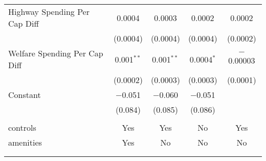 \begin{table}[!htbp]
\begin{tabular}{@{\extracolsep{5pt}}lcccc}
  Highway Spending Per Cap Diff & 0.0004 & 0.0003 & 0.0002 & 0.0002 \\ 
  & (0.0004) & (0.0004) & (0.0004) & (0.0002) \\ 
  Welfare Spending Per Cap Diff & 0.001$^{**}$ & 0.001$^{**}$ & 0.0004$^{*}$ & $-$0.00003 \\ 
  & (0.0002) & (0.0003) & (0.0003) & (0.0001) \\ 
  Constant & $-$0.051 & $-$0.060 & $-$0.051 &  \\ 
  & (0.084) & (0.085) & (0.086) &  \\ 
 \hline \\[-1.8ex] 
controls & Yes & Yes & No & Yes \\ 
amenities & Yes & No & No & No \\ 
\hline \\[-1.8ex] 
\hline 
\hline \\[-1.8ex] 
\end{tabular} 
\end{table} 
